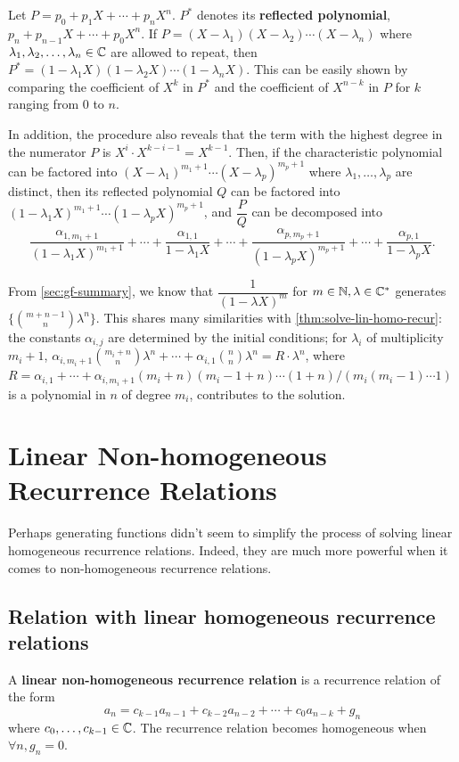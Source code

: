 \documentclass[a4paper, 12pt]{report}
\begin{document}
\begin{rem}\label{lem:roots-reflected-poly}
Let $P = p_0 + p_1 X + \cdots + p_n X^n$. $P^*$ denotes its \textbf{reflected polynomial}, $p_n + p_{n - 1} X + \cdots + p_0 X^n$. If $P = (X - \lambda_1) (X - \lambda_2) \cdots (X - \lambda_n)$ where $\lambda_1, \lambda_2, \dots, \lambda_n \in \mathbb{C}$ are allowed to repeat, then $P^* = (1 - \lambda_1 X)(1 - \lambda_2 X)\cdots(1 - \lambda_n X)$. This can be easily shown by comparing the coefficient of $X^k$ in $P^*$ and the coefficient of $X^{n - k}$ in $P$ for $k$ ranging from $0$ to $n$. 
\end{rem}

In addition, the procedure also reveals that the term with the highest degree in the numerator $P$ is $X^i \cdot X^{k - i - 1} = X^{k - 1}$. Then, if the characteristic polynomial can be factored into $(X - \lambda_1)^{m_1 + 1} \cdots (X - \lambda_p)^{m_p + 1}$ where $\lambda_1, \dots, \lambda_p$ are distinct, then its reflected polynomial $Q$ can be factored into $(1 - \lambda_1 X)^{m_1 + 1} \cdots (1 - \lambda_p X)^{m_p + 1}$, and $\dfrac{P}{Q}$ can be decomposed into
\[\frac{\alpha_{1, m_1 + 1}}{(1 - \lambda_1 X)^{m_1 + 1}} + \cdots + \frac{\alpha_{1, 1}}{1 - \lambda_1 X} + \cdots + \frac{\alpha_{p, m_p + 1}}{(1 - \lambda_p X)^{m_p + 1}} + \cdots + \frac{\alpha_{p, 1}}{1 - \lambda_p X}.\]

From \cref{sec:gf-summary}, we know that $\dfrac{1}{(1 - \lambda X)^m}$ for $m \in \mathbb{N}, \lambda \in \mathbb{C}^*$ generates $\{\binom{m + n - 1}{n} \lambda^n\}$. This shares many similarities with \cref{thm:solve-lin-homo-recur}: the constants $\alpha_{i, j}$ are determined by the initial conditions; for $\lambda_i$ of multiplicity $m_i + 1$, $\alpha_{i, m_i + 1} \binom{m_i + n}{n} \lambda^n + \cdots + \alpha_{i, 1} \binom{n}{n} \lambda^n = R \cdot \lambda^n$, where $R = \alpha_{i, 1} + \cdots + \alpha_{i, m_i + 1}(m_i + n)(m_i - 1 + n)\cdots(1 + n)/(m_i(m_i - 1)\cdots1)$ is a polynomial in $n$ of degree $m_i$, contributes to the solution.

\section{Linear Non-homogeneous Recurrence Relations}Perhaps generating functions didn't seem to simplify the process of solving linear homogeneous recurrence relations. Indeed, they are much more powerful when it comes to non-homogeneous recurrence relations.

\subsection{Relation with linear homogeneous recurrence relations}
\begin{defn}
A \textbf{linear non-homogeneous recurrence relation} is a recurrence relation of the form
\[a_n = c_{k - 1}a_{n - 1} + c_{k - 2}a_{n - 2} + \cdots + c_0 a_{n - k} + g_n\]
where $c_0, \dots, c_{k - 1} \in \mathbb{C}$. The recurrence relation becomes homogeneous when $\forall n, g_n = 0$.
\end{defn}
\end{document}
